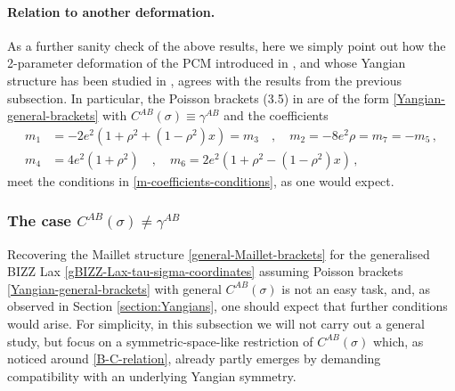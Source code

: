 \documentclass[12pt]{article}
\numberwithin{equation}{section}
\begin{document}
\paragraph{Relation to another deformation.} As a further sanity check of the above results, here we simply point out how the 2-parameter deformation of the PCM introduced in \cite{Rajeev:1988hq,Balog:1993es}, and whose Yangian structure has been studied in \cite{Itsios:2014vfa}, agrees with the results from the previous subsection. In particular, the Poisson brackets (3.5) in \cite{Itsios:2014vfa} are of the form \eqref{Yangian-general-brackets} with $C^{AB}(\sigma)\equiv \gamma^{AB}$ and the coefficients
\begin{equation}
\begin{aligned}
m_{1}&=-2e^2(1+\rho^2+(1-\rho^2)x)=m_{3}
\quad , \quad 
m_{2}=-8e^2\rho=m_{7}=-m_{5} \, ,
\\
m_{4}&=4e^2(1+\rho^2)
\quad , \quad 
m_{6}=2e^2(1+\rho^2-(1-\rho^2)x) \, ,
\end{aligned}
\end{equation}
meet the conditions in \eqref{m-coefficients-conditions}, as one would expect.






\subsubsection{The case $C^{AB}(\sigma)\neq \gamma^{AB}$} 
Recovering the Maillet structure \eqref{general-Maillet-brackets} for the generalised BIZZ Lax \eqref{gBIZZ-Lax-tau-sigma-coordinates} assuming Poisson brackets \eqref{Yangian-general-brackets} with general $C^{AB}(\sigma)$ is not an easy task, and, as observed in Section \ref{section:Yangians}, one should expect that further conditions would arise. For simplicity, in this subsection we will not carry out a general study, but focus on a symmetric-space-like restriction of  $C^{AB}(\sigma)$ which, as noticed around \eqref{B-C-relation}, already partly emerges by demanding compatibility with an underlying Yangian symmetry.
\end{document}
